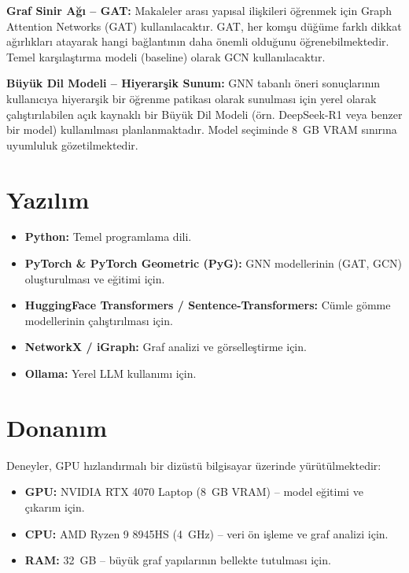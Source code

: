 \textbf{Graf Sinir Ağı -- GAT:}
Makaleler arası yapısal ilişkileri öğrenmek için Graph Attention Networks (GAT) \cite{velickovic2018graph} kullanılacaktır. GAT, her komşu düğüme farklı dikkat ağırlıkları atayarak hangi bağlantının daha önemli olduğunu öğrenebilmektedir. Temel karşılaştırma modeli (baseline) olarak GCN \cite{kipf2017semi} kullanılacaktır.

\textbf{Büyük Dil Modeli -- Hiyerarşik Sunum:}
GNN tabanlı öneri sonuçlarının kullanıcıya hiyerarşik bir öğrenme patikası olarak sunulması için yerel olarak çalıştırılabilen açık kaynaklı bir Büyük Dil Modeli (örn. DeepSeek-R1 veya benzer bir model) kullanılması planlanmaktadır. Model seçiminde 8~GB VRAM sınırına uyumluluk gözetilmektedir.

\section{Yazılım}

\begin{itemize}
    \item \textbf{Python:} Temel programlama dili.
    \item \textbf{PyTorch \& PyTorch Geometric (PyG):} GNN modellerinin (GAT, GCN) oluşturulması ve eğitimi için.
    \item \textbf{HuggingFace Transformers / Sentence-Transformers:} Cümle gömme modellerinin çalıştırılması için.
    \item \textbf{NetworkX / iGraph:} Graf analizi ve görselleştirme için.
    \item \textbf{Ollama:} Yerel LLM kullanımı için.
\end{itemize}

\section{Donanım}

Deneyler, GPU hızlandırmalı bir dizüstü bilgisayar üzerinde yürütülmektedir:
\begin{itemize}
    \item \textbf{GPU:} NVIDIA RTX 4070 Laptop (8~GB VRAM) -- model eğitimi ve çıkarım için.
    \item \textbf{CPU:} AMD Ryzen 9 8945HS (4~GHz) -- veri ön işleme ve graf analizi için.
    \item \textbf{RAM:} 32~GB -- büyük graf yapılarının bellekte tutulması için.
\end{itemize}